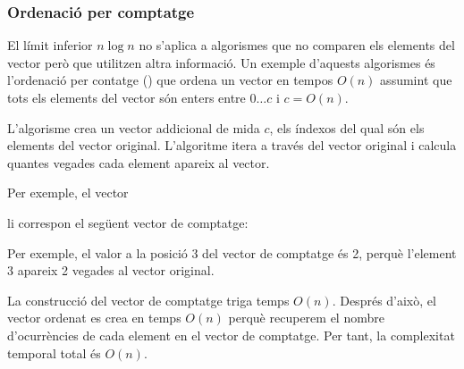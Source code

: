 \subsubsection{Ordenació per comptatge}


El límit inferior $n \log n$ no s'aplica a
algorismes que no comparen els elements del vector
però que utilitzen altra informació.
Un exemple d'aquests algorismes és
l'ordenació per contatge () que ordena
un vector en tempos $O(n)$ assumint que tots els elements del
vector són enters entre $0 \ldots c$ i $c=O(n)$.

L'algorisme crea un vector addicional de mida $c$, els 
índexos del qual són els elements del vector original.
L'algoritme itera a través del vector original
i calcula quantes vegades cada element
apareix al vector.

Per exemple, el vector
\begin{center}
\end{center}
li correspon el seg\"uent vector de comptatge:
\begin{center}
\end{center}

Per exemple, el valor a la posició 3
del vector de comptatge és 2,
perquè l'element 3 apareix 2 vegades
al vector original.

La construcció del vector de comptatge
triga temps $O(n)$. Després d'això, el vector ordenat
es crea en temps $O(n)$ perquè recuperem el nombre
d'ocurrències de cada element en el vector de comptatge.
Per tant, la complexitat temporal total és $O(n)$.


